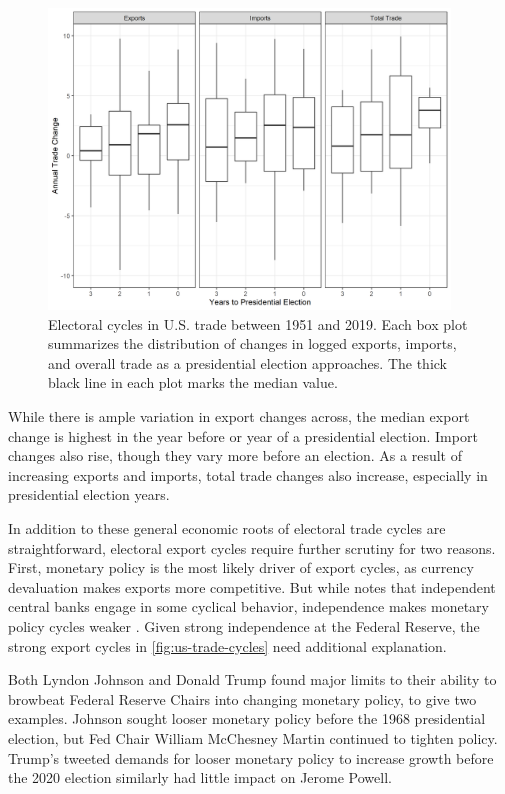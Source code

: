 \documentclass[12pt]{article}
\begin{document}
\begin{figure}
\centering
\includegraphics[width=0.95\textwidth]{../figures/us-trade-cycles.png}
\caption{Electoral cycles in U.S. trade between 1951 and 2019. Each box plot summarizes the distribution of changes in logged exports, imports, and overall trade as a presidential election approaches. The thick black line in each plot marks the median value.}
\label{fig:us-trade-cycles}
\end{figure}


While there is ample variation in export changes across, the median export change is highest in the year before or year of a presidential election.
Import changes also rise, though they vary more before an election. 
As a result of increasing exports and imports, total trade changes also increase, especially in presidential election years.


In addition to these general economic roots of electoral trade cycles are straightforward, electoral export cycles require further scrutiny for two reasons.
First, monetary policy is the most likely driver of export cycles, as currency devaluation makes exports more competitive. 
But while \citet[pg. 247]{Dubois2016} notes that independent central banks engage in some cyclical behavior, independence makes monetary policy cycles weaker \citep{ClarkHallerberg2000}. 
Given strong independence at the Federal Reserve, the strong export cycles in \autoref{fig:us-trade-cycles} need additional explanation. 


Both Lyndon Johnson and Donald Trump found major limits to their ability to browbeat Federal Reserve Chairs into changing monetary policy, to give two examples. 
Johnson sought looser monetary policy before the 1968 presidential election, but Fed Chair William McChesney Martin continued to tighten policy.
Trump's tweeted demands for looser monetary policy to increase growth before the 2020 election similarly had little impact on Jerome Powell. 
\end{document}

